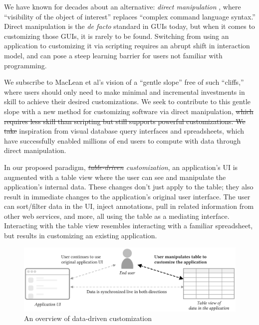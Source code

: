 \documentclass[sigplan,screen,10pt,anonymous,review]{acmart}
\providecommand{\DIFadd}[1]{{\protect\color{blue}\uwave{#1}}} %
\providecommand{\DIFdel}[1]{{\protect\color{red}\sout{#1}}}                      %
\providecommand{\DIFaddbegin}{} %
\providecommand{\DIFaddend}{} %
\providecommand{\DIFdelbegin}{} %
\providecommand{\DIFdelend}{} %
\providecommand{\DIFaddbeginFL}{} %
\providecommand{\DIFaddendFL}{} %
\providecommand{\DIFdelbeginFL}{} %
\providecommand{\DIFdelendFL}{} %
\begin{document}
We have known for decades about an alternative: \emph{direct
manipulation} \citep{shneiderman1983}, where ``visibility of the object
of interest'' replaces ``complex command language syntax.'' Direct
manipulation is the \emph{de facto} standard in GUIs today, but when it
comes to customizing those GUIs, it is rarely to be found. Switching
from using an application to customizing it via scripting requires an
abrupt shift in interaction model, and can pose a steep learning barrier
for users not familiar with programming.

We subscribe to MacLean et al\DIFaddbegin \DIFadd{.}\DIFaddend 's vision of a ``gentle slope''
\citep{maclean1990} free of such ``cliffs,'' where users should only
need to make minimal and incremental investments in skill to achieve
their desired customizations. We seek to contribute to this gentle slope
with a new method for customizing software via direct manipulation,
\DIFdelbegin \DIFdel{which requires less skill than scripting but still supports powerful
customizations. We take }\DIFdelend \DIFaddbegin \DIFadd{taking }\DIFaddend inspiration from visual database query interfaces and
spreadsheets, which have successfully enabled millions of end users to
compute with data through direct manipulation.

In our proposed paradigm, \emph{\DIFdelbegin \DIFdel{table-driven }\DIFdelend \DIFaddbegin \DIFadd{data-driven }\DIFaddend customization}, an
application's UI is augmented with a table view where the user can see
and manipulate the application's internal data. These changes don't just
apply to the table; they also result in immediate changes to the
application's original user interface. The user can sort/filter data in
the UI, inject annotations, pull in related information from other web
services, and more, all using the table as a mediating interface.
Interacting with the table view resembles interacting with a familiar
spreadsheet, but results in customizing an existing application.

\begin{figure}
\DIFdelbeginFL %
\DIFdelendFL \DIFaddbeginFL \hypertarget{fig:overview}{%
\centering
\includegraphics[width=\textwidth]{media/overview.eps}
\caption{An overview of data-driven customization}\label{fig:overview}
}
\DIFaddendFL \end{figure}
\end{document}
